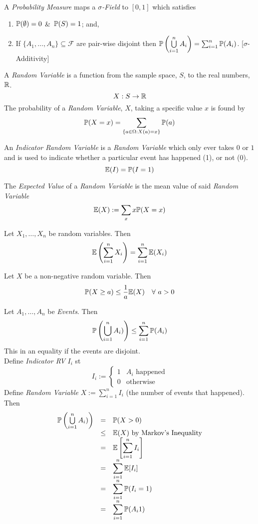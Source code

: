 \documentclass[11pt,a4paper]{article}
\begin{document}
A \textit{Probability Measure} maps a \textit{$\sigma$-Field} to $[0,1]$ which satisfies
\begin{enumerate}
	\item $\mathbb{P}(\emptyset)=0$ \&\ $\mathbb{P}(S)=1$; and,
	\item If $\{A_1,\dots,A_n\}\subseteq\mathcal{F}$ are pair-wise disjoint then $\mathbb{P}\left(\bigcup\limits_{i=1}^nA_i\right)=\sum_{i=1}^n\mathbb{P}(A_i)$. [$\sigma$-Additivity]
\end{enumerate}

A \textit{Random Variable} is a function from the sample space, $S$, to the real numbers, $\mathbb{R}$.\\
$$X:S\to\mathbb{R}$$
The probability of a \textit{Random Variable}, $X$, taking a specific value $x$ is found by
$$\mathbb{P}(X=x)=\sum_{\{a\in \Omega:X(a)=x\}}\mathbb{P}(a)$$

An \textit{Indicator Random Variable} is a \textit{Random Variable} which only ever takes $0$ or $1$ and is used to indicate whether a particular event has happened (1), or not (0).
$$\mathbb{E}(I)=\mathbb{P}(I=1)$$

The \textit{Expected Value} of a \textit{Random Variable} is the mean value of said \textit{Random Variable}
$$\mathbb{E}(X):=\sum_x x\mathbb{P}(X=x)$$

Let $X_1,\dots,X_n$ be random variables. Then
$$\mathbb{E}\left(\sum_{i=1}^nX_i\right)=\sum_{i=1}^n\mathbb{E}(X_i)$$

Let $X$ be a non-negative random variable. Then
$$\prob(X\geq a)\leq\frac1a\expect(X)\quad\forall\ a>0$$

Let $A_1,\dots,A_n$ be \textit{Events}. Then
$$\mathbb{P}\left(\bigcup\limits_{i=1}^nA_i)\right)\leq\sum_{i=1}^n\mathbb{P}(A_i)$$
\nb This in an equality if the events are disjoint.\\

Define \textit{Indicator RV} $I_i$ st
$$I_i:=\begin{cases}1&A_i\text{ happened}\\0&\text{otherwise}\end{cases}$$
Define \textit{Random Variable} $X:=\sum_{i=1}^nI_i$ (the number of events that happened).\\
Then
\[\begin{array}{rcl}
\mathbb{P}\left(\bigcup\limits_{i=1}^nA_i)\right)&=&\mathbb{P}(X>0)\\
&\leq&\mathbb{E}(X)\text{ by Markov's Inequality}\\
&=&\mathbb{E}\left[\displaystyle\sum_{i=1}^nI_i\right]\\
&=&\displaystyle\sum_{i=1}^n\mathbb{E}[I_i]\\
&=&\displaystyle\sum_{i=1}^n\mathbb{P}(I_i=1)\\
&=&\displaystyle\sum_{i=1}^n\mathbb{P}(A_i1)
\end{array}\]
\proved
\end{document}
